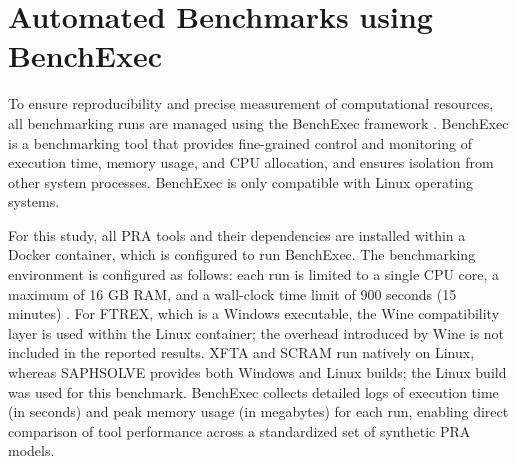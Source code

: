 \section{Automated Benchmarks using BenchExec}
\label{sec:benchexec}

To ensure reproducibility and precise measurement of computational resources, all benchmarking runs are managed using the BenchExec framework \cite{2024sosy}. BenchExec is a benchmarking tool that provides fine-grained control and monitoring of execution time, memory usage, and CPU allocation, and ensures isolation from other system processes. BenchExec is only compatible with Linux operating systems.

For this study, all PRA tools and their dependencies are installed within a Docker container, which is configured to run BenchExec. The benchmarking environment is configured as follows: each run is limited to a single CPU core, a maximum of 16 GB RAM, and a wall-clock time limit of 900 seconds (15 minutes) \cite{Farag2024Evaluating}. For FTREX, which is a Windows executable, the Wine compatibility layer is used within the Linux container; the overhead introduced by Wine is not included in the reported results. XFTA and SCRAM run natively on Linux, whereas SAPHSOLVE provides both Windows and Linux builds; the Linux build was used for this benchmark. BenchExec collects detailed logs of execution time (in seconds) and peak memory usage (in megabytes) for each run, enabling direct comparison of tool performance across a standardized set of synthetic PRA models.

